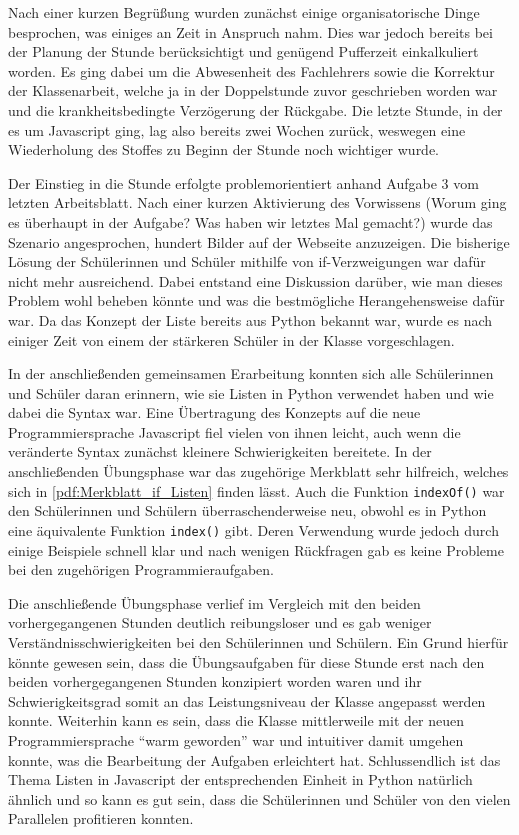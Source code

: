 Nach einer kurzen Begrüßung wurden zunächst einige organisatorische Dinge besprochen, was einiges an Zeit in Anspruch nahm.
Dies war jedoch bereits bei der Planung der Stunde berücksichtigt und genügend Pufferzeit einkalkuliert worden.
Es ging dabei um die Abwesenheit des Fachlehrers sowie die Korrektur der Klassenarbeit, welche ja in der Doppelstunde zuvor geschrieben worden war und die krankheitsbedingte Verzögerung der Rückgabe.
Die letzte Stunde, in der es um Javascript ging, lag also bereits zwei Wochen zurück, weswegen eine Wiederholung des Stoffes zu Beginn der Stunde noch wichtiger wurde.

Der Einstieg in die Stunde erfolgte problemorientiert anhand Aufgabe 3 vom letzten Arbeitsblatt.
Nach einer kurzen Aktivierung des Vorwissens (Worum ging es überhaupt in der Aufgabe? Was haben wir letztes Mal gemacht?) wurde das Szenario angesprochen, hundert Bilder auf der Webseite anzuzeigen.
Die bisherige Lösung der Schülerinnen und Schüler mithilfe von if-Verzweigungen war dafür nicht mehr ausreichend.
Dabei entstand eine Diskussion darüber, wie man dieses Problem wohl beheben könnte und was die bestmögliche Herangehensweise dafür war.
Da das Konzept der Liste bereits aus Python bekannt war, wurde es nach einiger Zeit von einem der stärkeren Schüler in der Klasse vorgeschlagen.

In der anschließenden gemeinsamen Erarbeitung konnten sich alle Schülerinnen und Schüler daran erinnern, wie sie Listen in Python verwendet haben und wie dabei die Syntax war.
Eine Übertragung des Konzepts auf die neue Programmiersprache Javascript fiel vielen von ihnen leicht, auch wenn die veränderte Syntax zunächst kleinere Schwierigkeiten bereitete.
In der anschließenden Übungsphase war das zugehörige Merkblatt sehr hilfreich, welches sich in \autoref{pdf:Merkblatt_if_Listen} finden lässt.
Auch die Funktion \texttt{indexOf()} war den Schülerinnen und Schülern überraschenderweise neu, obwohl es in Python eine äquivalente Funktion \texttt{index()} gibt.
Deren Verwendung wurde jedoch durch einige Beispiele schnell klar und nach wenigen Rückfragen gab es keine Probleme bei den zugehörigen Programmieraufgaben.

Die anschließende Übungsphase verlief im Vergleich mit den beiden vorhergegangenen Stunden deutlich reibungsloser und es gab weniger Verständnisschwierigkeiten bei den Schülerinnen und Schülern.
Ein Grund hierfür könnte gewesen sein, dass die Übungsaufgaben für diese Stunde erst nach den beiden vorhergegangenen Stunden konzipiert worden waren und ihr Schwierigkeitsgrad somit an das Leistungsniveau der Klasse angepasst werden konnte.
Weiterhin kann es sein, dass die Klasse mittlerweile mit der neuen Programmiersprache ``warm geworden'' war und intuitiver damit umgehen konnte, was die Bearbeitung der Aufgaben erleichtert hat.
Schlussendlich ist das Thema Listen in Javascript der entsprechenden Einheit in Python natürlich ähnlich und so kann es gut sein, dass die Schülerinnen und Schüler von den vielen Parallelen profitieren konnten.

